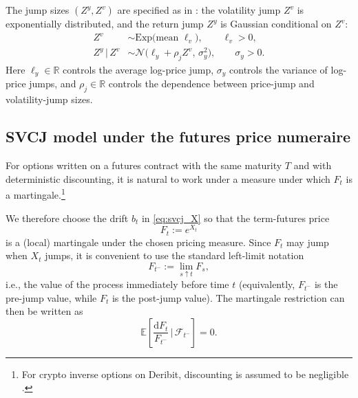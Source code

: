 \documentclass[a4paper,titlepage,12pt]{report}
\theoremstyle{plain}
\begin{document}
The jump sizes $(Z^y,Z^v)$ are specified as in \citet{HouEtAl2020}: the volatility jump $Z^v$ is exponentially distributed, and the return jump $Z^y$ is Gaussian conditional on $Z^v$:
\begin{align}
Z^{v} &\sim \text{Exp(mean } \ell_v \text{)}, \qquad \ell_v>0, \label{eq:Zv_exp}\\
Z^{y}\,|\,Z^{v} &\sim \mathcal{N}\!\big(\ell_y + \rho_j Z^{v},\, \sigma_y^2\big), \qquad \sigma_y>0. \label{eq:Zy_condnorm}
\end{align}
Here $\ell_y \in \mathbb{R}$ controls the average log-price jump, $\sigma_y$ controls the variance of log-price jumps, and $\rho_j \in \mathbb{R}$ controls the dependence between price-jump and volatility-jump sizes.

\subsection{SVCJ model under the futures price numeraire}
\label{subsec:martingale_restriction}

For options written on a futures contract with the same maturity $T$ and with deterministic discounting, it is natural to work under a measure under which $F_t$ is a martingale.\footnote{For crypto inverse options on Deribit, discounting is assumed to be negligible \citep{LucicSepp2024}.}

We therefore choose the drift $b_t$ in \eqref{eq:svcj_X} so that the term-futures price
\[
F_t := e^{X_t}
\]
is a (local) martingale under the chosen pricing measure. Since $F_t$ may jump when $X_t$ jumps, it
is convenient to use the standard left-limit notation
\[
F_{t^-} := \lim_{s\uparrow t} F_s,
\]
i.e., the value of the process immediately before time $t$ (equivalently, $F_{t^-}$ is the
pre-jump value, while $F_t$ is the post-jump value). The martingale restriction can then be written as
\begin{equation}
\mathbb{E}\!\left[\frac{\mathrm{d}F_t}{F_{t^-}} \,\bigg|\, \mathcal{F}_{t^-}\right] = 0.
\label{eq:martingale_cond}
\end{equation}
\end{document}
